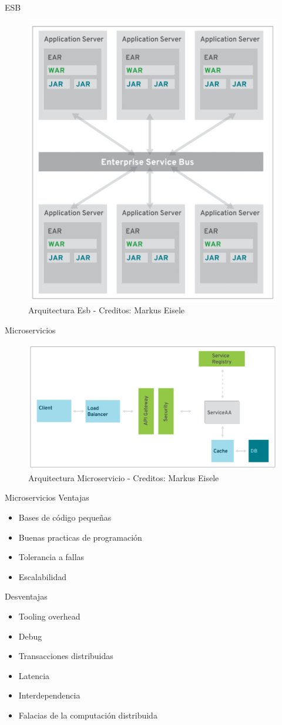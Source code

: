 \documentclass{beamer}
\begin{document}
\begin{frame}{ESB}
\begin{figure}
	\centering
	\includegraphics[width=0.5\linewidth]{Images/esb}
	\caption{Arquitectura Esb - Creditos: Markus Eisele}
\end{figure}
\end{frame}

\begin{frame}{Microservicios}
\begin{figure}
	\centering
	\includegraphics[width=\linewidth]{Images/microservicios}
	\caption{Arquitectura Microservicio - Creditos: Markus Eisele}
\end{figure}
\end{frame}



\begin{frame}{Microservicios}
Ventajas
\begin{itemize}
	\item Bases de código pequeñas
	\item Buenas practicas de programación
	\item Tolerancia a fallas
	\item Escalabilidad
\end{itemize}
Desventajas
\begin{itemize}
	\item Tooling overhead
	\item Debug
	\item Transacciones distribuidas
	\item Latencia
	\item Interdependencia
		\item Falacias de la computación distribuida
\end{itemize}
\end{frame}
\end{document}
